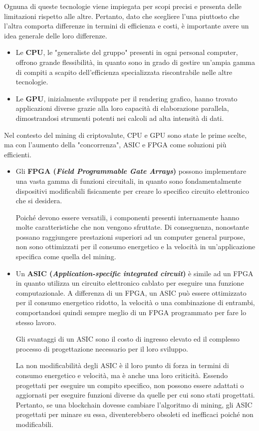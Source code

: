 Ognuna di queste tecnologie viene impiegata per scopi precisi e presenta delle limitazioni rispetto alle altre.
Pertanto, dato che scegliere l'una piuttosto che l'altra comporta differenze in termini di efficienza e costi, è importante avere un idea generale delle loro differenze.

\begin{itemize}
    \item Le \textbf{CPU}, le "generaliste del gruppo" presenti in ogni personal computer, offrono grande flessibilità, in quanto sono in grado di gestire un'ampia gamma di compiti a scapito dell'efficienza specializzata riscontrabile nelle altre tecnologie.
    \item Le \textbf{GPU}, inizialmente sviluppate per il rendering grafico, hanno trovato applicazioni diverse grazie alla loro capacità di elaborazione parallela, dimostrandosi strumenti potenti nei calcoli ad alta intensità di dati.
\end{itemize}

Nel contesto del mining di criptovalute, CPU e GPU sono state le prime scelte, ma con l'aumento della "concorrenza", ASIC e FPGA come soluzioni più efficienti.

\begin{itemize}
    \item Gli \textbf{FPGA (\textit{Field Programmable Gate Arrays})} possono implementare una vasta gamma di funzioni circuitali, in quanto sono fondamentalmente dispositivi modificabili fisicamente per creare lo specifico circuito elettronico che si desidera. 

    Poiché devono essere versatili, i componenti presenti internamente hanno molte caratteristiche che non vengono sfruttate. 
    Di conseguenza, nonostante possano raggiungere prestazioni superiori ad un computer general purpose, non sono ottimizzati per il consumo energetico e la velocità in un'applicazione specifica come quella del mining. 

    \item Un \textbf{ASIC (\textit{Application-specific integrated circuit})} è simile ad un FPGA in quanto utilizza un circuito elettronico cablato per eseguire una funzione computazionale. 
    A differenza di un FPGA, un ASIC può essere ottimizzato per il consumo energetico ridotto, la velocità o una combinazione di entrambi, comportandosi quindi sempre meglio di un FPGA programmato per fare lo stesso lavoro. 
    
    Gli svantaggi di un ASIC sono il costo di ingresso elevato ed il complesso processo di progettazione necessario per il loro sviluppo.

    La non modificabilità degli ASIC è il loro punto di forza in termini di consumo energetico e velocità, ma è anche una loro criticità. 
    Essendo progettati per eseguire un compito specifico, non possono essere adattati o aggiornati per eseguire funzioni diverse da quelle per cui sono stati progettati. 
    Pertanto, se una blockchain dovesse cambiare l'algoritmo di mining, gli ASIC progettati per minare su essa, diventerebbero obsoleti ed inefficaci poiché non modificabili.
\end{itemize}


